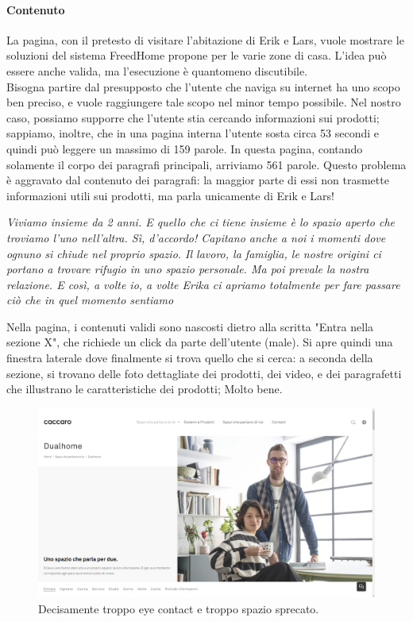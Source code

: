\paragraph*{Contenuto} La pagina, con il pretesto di visitare l'abitazione di Erik e Lars, vuole mostrare le soluzioni del sistema FreedHome propone per le varie zone di casa. L'idea può essere anche valida, ma l'esecuzione è quantomeno discutibile.\\
Bisogna partire dal presupposto che l'utente che naviga su internet ha uno scopo ben preciso, e vuole raggiungere tale scopo nel minor tempo possibile. Nel nostro caso, possiamo supporre che l'utente stia cercando informazioni sui prodotti; sappiamo, inoltre, che in una pagina interna l'utente sosta circa 53 secondi e quindi può leggere un massimo di 159 parole. In questa pagina, contando solamente il corpo dei paragrafi principali, arriviamo 561 parole. Questo problema è aggravato dal contenuto dei paragrafi: la maggior parte di essi non trasmette informazioni utili sui prodotti, ma parla unicamente di Erik e Lars!

\begin{displayquote}
    \textit{Viviamo insieme da 2 anni. E quello che ci tiene insieme è lo spazio aperto che troviamo l’uno
nell’altra. Sì, d’accordo! Capitano anche a noi i momenti dove ognuno si chiude nel proprio
spazio. Il lavoro, la famiglia, le nostre origini ci portano a trovare rifugio in uno spazio
personale. Ma poi prevale la nostra relazione. E così, a volte io, a volte Erika ci apriamo
totalmente per fare passare ciò che in quel momento sentiamo}
\end{displayquote}

Nella pagina, i contenuti validi sono nascosti dietro alla scritta "Entra nella sezione X", che richiede un click da parte dell'utente (male). Si apre quindi una finestra laterale dove finalmente si trova quello che si cerca: a seconda della sezione, si trovano delle foto dettagliate dei prodotti, dei video, e dei paragrafetti che illustrano le caratteristiche dei prodotti; Molto bene.

\begin{figure}
    \includegraphics[width=\textwidth]{sez/DualHome/img/main.png}
    \caption{Decisamente troppo eye contact e troppo spazio sprecato.}
    \label{fig:Dual_FirstCut}
\end{figure}

